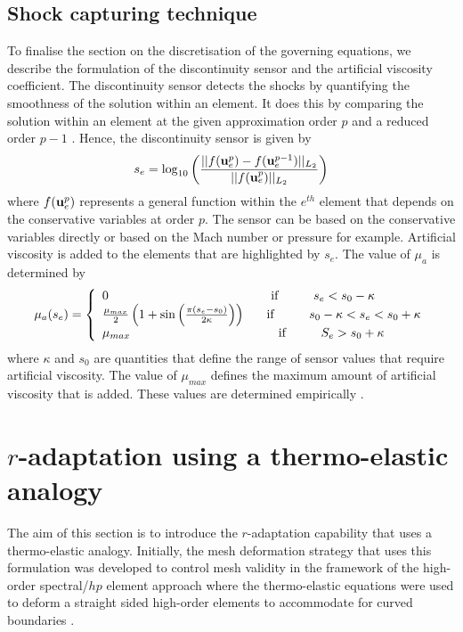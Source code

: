 \documentclass[review]{elsarticle}
\begin{document}
\subsection{Shock capturing technique}
To finalise the section on the discretisation of the governing equations, we describe the formulation of the discontinuity sensor and the artificial viscosity coefficient. The discontinuity sensor detects the shocks by quantifying the smoothness of the solution within an element. It does this by comparing the solution within an element at the given approximation order $p$ and a reduced order $p-1$ \cite{Persson2006}. Hence, the discontinuity sensor is given by
\begin{equation}\label{eq:sensor}
s_e=\log_{10}\left(\frac{||f({\bf u}^p_e)-f({\bf u}^{p-1}_e)||_{L_2}}{||f({\bf u}_e^p)||_{L_2}}\right)
\end{equation}
where $f({\bf u}^p_e)$ represents a general function within the $e^{th}$ element that depends on the conservative variables at order $p$. The sensor can be based on the conservative variables directly or based on the Mach number or pressure for example.
Artificial viscosity is added to the elements that are highlighted by $s_e$. The value of $\mu_a$ is determined by
\begin{eqnarray}\label{eq:mua}  \mu_a(s_e)
=\left \{ \begin{array}{l}
      0\hspace{46mm}\mbox{if}\hspace{10mm}s_e<s_0-\kappa\\  
     \frac{\mu_{max}}{2}\left(1+\sin{\left(\frac{\pi\left(s_e-s_0\right)}{2\kappa}\right)}\right)\hspace{6mm}\mbox{if}\hspace{10mm}s_0-\kappa<s_e<s_0+\kappa\\
     \mu_{max}\hspace{42mm}\mbox{if}\hspace{10mm}S_e>s_0+\kappa
    \end{array} 
    \right.
\end{eqnarray}
where $\kappa$ and $s_0$ are quantities that define the range of sensor values that require artificial viscosity. The value of $\mu_{max}$ defines the maximum amount of artificial viscosity that is added. These values are determined empirically \cite{Persson2006}.
\section{$r$-adaptation using a thermo-elastic analogy}
The aim of this section is to introduce the $r$-adaptation capability that uses a thermo-elastic analogy. Initially, the mesh deformation strategy that uses this formulation was developed to control mesh validity in the framework of the high-order spectral/$hp$ element approach where the thermo-elastic equations were used to deform a straight sided high-order elements to accommodate for curved boundaries \cite{Moxey2015}.
\end{document}
